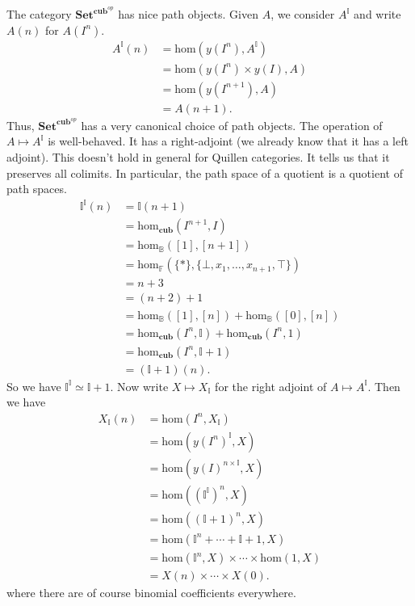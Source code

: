 \documentclass{article}
\newcommand{\ccub}{\mathbf{cub}}
\newcommand{\cSet}{\mathbf{Set}^{\ccub^{op}}}
\begin{document}
The category $\cSet$ has nice path objects. Given $A$, we consider $A^\mathbb{I}$
and write $A(n)$ for $A(I^n)$.
\begin{align*}
A^{\mathbb{I}}(n) & = \mathrm{hom}(y(I^n),A^\mathbb{I})\\
& = \mathrm{hom}(y(I^n)\times y(I),A)\\
& = \mathrm{hom}(y(I^{n+1}),A)\\
& = A(n+1).
\end{align*}
Thus, $\cSet$ has a very canonical choice of path objects. The operation of
$A\mapsto A^\mathbb{I}$ is well-behaved. It has a right-adjoint (we already
know that it has a left adjoint). This doesn't
hold in general for Quillen categories. It tells us that it preserves all
colimits. In particular, the path space of a quotient is a quotient of path
spaces.
\begin{align*}
\mathbb{I}^\mathbb{I}(n) & = \mathbb{I}(n+1)\\
& = \mathrm{hom}_{\ccub}(I^{n+1},I)\\
& = \mathrm{hom}_\mathbb{B}([1],[n+1])\\
& = \mathrm{hom}_\mathbb{F}(\{\ast\},\{\bot,x_1,\ldots,x_{n+1},\top\})\\
& = n+3\\
& = (n+2)+1\\
& = \mathrm{hom}_\mathbb{B}([1],[n])+\mathrm{hom}_\mathbb{B}([0],[n])\\
& = \mathrm{hom}_{\ccub}(I^n,\mathbb{I})+\mathrm{hom}_{\ccub}(I^n,1)\\
& = \mathrm{hom}_\ccub(I^n,\mathbb{I}+1)\\
& = (\mathbb{I}+1)(n).
\end{align*}
So we have $\mathbb{I}^\mathbb{I}\simeq\mathbb{I}+1$. Now write 
$X\mapsto X_\mathbb{I}$ for the right adjoint of $A\mapsto A^\mathbb{I}$. Then
we have
\begin{align*}
X_\mathbb{I}(n) & = \mathrm{hom}(I^n,X_\mathbb{I})\\
& = \mathrm{hom}(y(I^n)^\mathbb{I}, X)\\
& = \mathrm{hom}(y(I)^{n\times \mathbb{I}},X)\\
& = \mathrm{hom}((\mathbb{I}^\mathbb{I})^n,X)\\
& = \mathrm{hom}((\mathbb{I}+1)^n,X)\\
& = \mathrm{hom}(\mathbb{I}^n+\cdots+\mathbb{I}+1,X)\\
& = \mathrm{hom}(\mathbb{I}^n,X)\times\cdots\times\mathrm{hom}(1,X)\\
& = X(n)\times\cdots\times X(0).
\end{align*}
where there are of course binomial coefficients everywhere.
\end{document}
